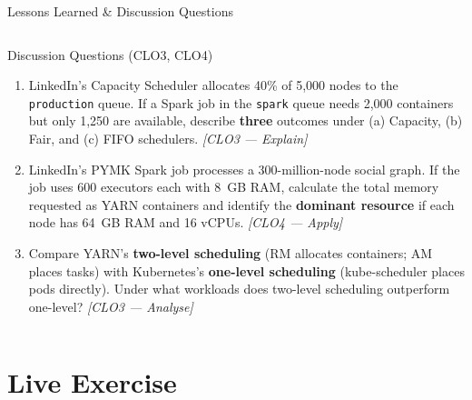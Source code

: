 \documentclass[aspectratio=169,10pt]{beamer}
\begin{document}
\begin{frame}{Lessons Learned \& Discussion Questions}
\begin{columns}[T]
      \begin{alertblock}{Discussion Questions \textmd{\tiny (CLO3, CLO4)}}
        \begin{enumerate}
          \item LinkedIn's Capacity Scheduler allocates 40\% of
                5{,}000 nodes to the \texttt{production} queue.
                If a Spark job in the \texttt{spark} queue needs
                2{,}000 containers but only 1{,}250 are available,
                describe \textbf{three} outcomes under (a) Capacity,
                (b) Fair, and (c) FIFO schedulers.
                \textit{[CLO3 — Explain]}
          \item LinkedIn's PYMK Spark job processes a
                300-million-node social graph.
                If the job uses 600 executors each with 8~GB RAM,
                calculate the total memory requested as YARN containers
                and identify the \textbf{dominant resource} if each
                node has 64~GB RAM and 16 vCPUs.
                \textit{[CLO4 — Apply]}
          \item Compare YARN's \textbf{two-level scheduling}
                (RM allocates containers; AM places tasks)
                with Kubernetes's \textbf{one-level scheduling}
                (kube-scheduler places pods directly).
                Under what workloads does two-level scheduling
                outperform one-level?
                \textit{[CLO3 — Analyse]}
        \end{enumerate}
      \end{alertblock}
  \end{columns}
\end{frame}

\section{Live Exercise}
\end{document}
